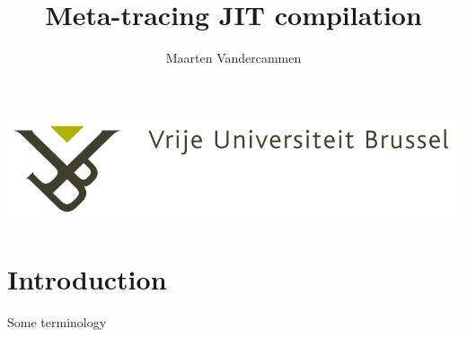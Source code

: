 \documentclass{beamer}
\title{Meta-tracing JIT compilation}
\author{Maarten Vandercammen}
\date{}
\begin{document}
\begin{frame}[plain]
\includegraphics[width=0.4\paperwidth]{VUB_logo.jpg}
\vspace{2cm}
\titlepage
\end{frame}


\section{Introduction}

\begin{frame}{Some terminology}


\end{frame}
\end{document}
